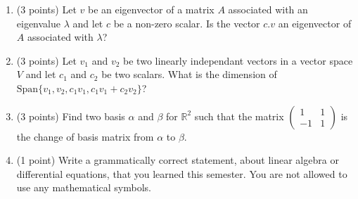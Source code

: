 \documentclass[11pt]{article}
\begin{document}
\begin{enumerate}
\begin{enumerate}
\vspace{2.5cm}

\item (3 points) Let $v$ be an eigenvector of a matrix $A$ associated with an eigenvalue $\lambda$ and let $c$ be a non-zero scalar. Is the vector $c.v$ an eigenvector of $A$ associated with $\lambda$? \\

 \vspace{2.5cm}


\item (3 points) Let $v_1$ and $v_2$ be two linearly independant vectors in a vector space $V$ and let $c_1$ and $c_2$ be two scalars. What is the dimension of $\text{Span}\lbrace v_1,v_2, c_1 v_1,c_1 v_1+c_2 v_2 \rbrace$?
 \\

\vspace{2.5cm}

\item (3 points) Find two basis $\alpha$ and $\beta$ for $\mathbb{R}^2$ such that the matrix $\begin{pmatrix} 1 &1 \\ -1 & 1 \end{pmatrix}$ is the change of basis matrix from $\alpha$ to $\beta$.\\

\vspace{2.5cm}


\item (1 point) Write a grammatically correct statement, about linear algebra or differential equations, that you learned this semester. You are not allowed to use any mathematical symbols. 
 \\

\vspace{2cm}

\end{enumerate}


\end{enumerate}
\end{document}
